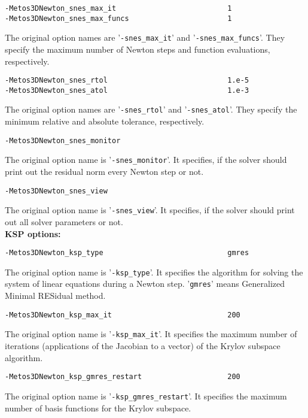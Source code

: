 \documentclass{article}
\begin{document}
\begin{verbatim}
-Metos3DNewton_snes_max_it                          1
-Metos3DNewton_snes_max_funcs                       1
\end{verbatim}
The original option names are '\texttt{-snes\_max\_it}' and '\texttt{-snes\_max\_funcs}'.
They specify the maximum number of Newton steps and function evaluations,
respectively.

\begin{verbatim}
-Metos3DNewton_snes_rtol                            1.e-5
-Metos3DNewton_snes_atol                            1.e-3
\end{verbatim}
The original option names are '\texttt{-snes\_rtol}' and '\texttt{-snes\_atol}'.
They specify the minimum relative and absolute tolerance,
respectively.

\begin{verbatim}
-Metos3DNewton_snes_monitor
\end{verbatim}
The original option name is '\texttt{-snes\_monitor}'. It specifies,
if the solver should print out the residual norm every Newton step or not.

\begin{verbatim}
-Metos3DNewton_snes_view
\end{verbatim}
The original option name is '\texttt{-snes\_view}'. It specifies,
if the solver should print out all solver parameters or not. \\

\textbf{KSP options:}

\begin{verbatim}
-Metos3DNewton_ksp_type                             gmres
\end{verbatim}
The original option name is '\texttt{-ksp\_type}'. It specifies the
algorithm for solving the system of linear equations during a
Newton step. '\texttt{gmres}' means Generalized Minimal RESidual method.

\begin{verbatim}
-Metos3DNewton_ksp_max_it                           200
\end{verbatim}
The original option name is '\texttt{-ksp\_max\_it}'. 
It specifies the maximum number of iterations (applications of the
Jacobian to a vector) of the Krylov subspace algorithm.

\begin{verbatim}
-Metos3DNewton_ksp_gmres_restart                    200
\end{verbatim}
The original option name is '\texttt{-ksp\_gmres\_restart}'.
It specifies the maximum number of basis functions for the Krylov subspace.
\end{document}
